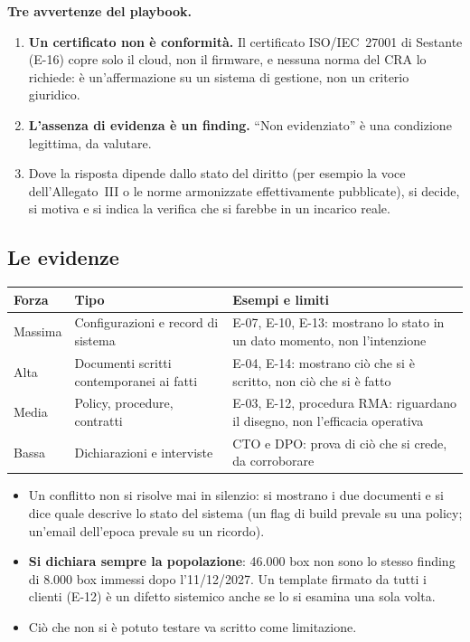 \begin{esame}
\textbf{Tre avvertenze del playbook.}
\begin{enumerate}
  \item \textbf{Un certificato non è conformità.} Il certificato ISO/IEC~27001 di Sestante (E-16)
    copre solo il cloud, non il firmware, e nessuna norma del CRA lo richiede: è un'affermazione su
    un sistema di gestione, non un criterio giuridico.
  \item \textbf{L'assenza di evidenza è un finding.} ``Non evidenziato'' è una condizione legittima,
    da valutare.
  \item Dove la risposta dipende dallo stato del diritto (per esempio la voce dell'Allegato~III o le
    norme armonizzate effettivamente pubblicate), si decide, si motiva e si indica la verifica che si
    farebbe in un incarico reale.
\end{enumerate}
\end{esame}

\subsection{Le evidenze}
\begin{center}
\small
\begin{tabularx}{\linewidth}{l l X}
\toprule
\textbf{Forza} & \textbf{Tipo} & \textbf{Esempi e limiti} \\ \midrule
Massima & Configurazioni e record di sistema & E-07, E-10, E-13: mostrano lo stato in un dato
  momento, non l'intenzione \\
Alta & Documenti scritti contemporanei ai fatti & E-04, E-14: mostrano ciò che si è scritto, non ciò
  che si è fatto \\
Media & Policy, procedure, contratti & E-03, E-12, procedura RMA: riguardano il disegno, non
  l'efficacia operativa \\
Bassa & Dichiarazioni e interviste & CTO e DPO: prova di ciò che si crede, da corroborare \\
\bottomrule
\end{tabularx}
\end{center}
\begin{itemize}
  \item Un conflitto non si risolve mai in silenzio: si mostrano i due documenti e si dice quale
    descrive lo stato del sistema (un flag di build prevale su una policy; un'email dell'epoca prevale
    su un ricordo).
  \item \textbf{Si dichiara sempre la popolazione}: 46.000 box non sono lo stesso finding di 8.000
    box immessi dopo l'11/12/2027. Un template firmato da tutti i clienti (E-12) è un difetto
    sistemico anche se lo si esamina una sola volta.
  \item Ciò che non si è potuto testare va scritto come limitazione.
\end{itemize}

